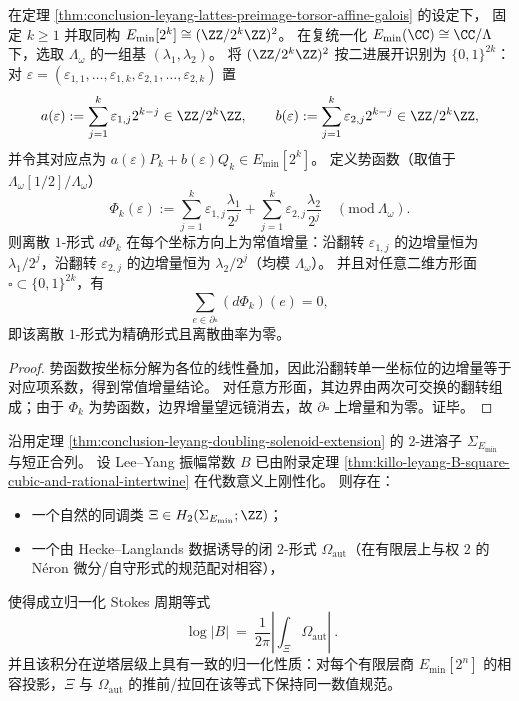 \begin{proposition}\label{prop:conclusion-leyang-lattes-hypercube-exact-form-zero-curvature}
在定理 \ref{thm:conclusion-leyang-lattes-preimage-torsor-affine-galois} 的设定下，
固定 \(k\ge 1\) 并取同构 \(E_{\min}[2^k]\cong (\ZZ/2^k\ZZ)^2\)。
在复统一化 \(E_{\min}(\CC)\cong \CC/\Lambda\) 下，选取 \(\Lambda_\omega\) 的一组基 \((\lambda_1,\lambda_2)\)。
将 \((\ZZ/2^k\ZZ)^2\) 按二进展开识别为 \(\{0,1\}^{2k}\)：
对 \(\varepsilon=(\varepsilon_{1,1},\dots,\varepsilon_{1,k},\varepsilon_{2,1},\dots,\varepsilon_{2,k})\) 置
\[
a(\varepsilon):=\sum_{j=1}^k \varepsilon_{1,j}2^{k-j}\in\ZZ/2^k\ZZ,\qquad
b(\varepsilon):=\sum_{j=1}^k \varepsilon_{2,j}2^{k-j}\in\ZZ/2^k\ZZ,
\]
并令其对应点为 \(a(\varepsilon)P_k+b(\varepsilon)Q_k\in E_{\min}[2^k]\)。
定义势函数（取值于 \(\Lambda_\omega[1/2]/\Lambda_\omega\)）
\[
\Phi_k(\varepsilon)
:=\sum_{j=1}^k \varepsilon_{1,j}\frac{\lambda_1}{2^j}+\sum_{j=1}^k \varepsilon_{2,j}\frac{\lambda_2}{2^j}\quad(\mathrm{mod}\ \Lambda_\omega).
\]
则离散 \(1\)-形式 \(d\Phi_k\) 在每个坐标方向上为常值增量：沿翻转 \(\varepsilon_{1,j}\) 的边增量恒为 \(\lambda_1/2^j\)，沿翻转 \(\varepsilon_{2,j}\) 的边增量恒为 \(\lambda_2/2^j\)（均模 \(\Lambda_\omega\)）。
并且对任意二维方形面 \(\square\subset \{0,1\}^{2k}\)，有
\[
\sum_{e\in \partial\square}(d\Phi_k)(e)=0,
\]
即该离散 \(1\)-形式为精确形式且离散曲率为零。
\end{proposition}
\begin{proof}
势函数按坐标分解为各位的线性叠加，因此沿翻转单一坐标位的边增量等于对应项系数，得到常值增量结论。
对任意方形面，其边界由两次可交换的翻转组成；由于 \(\Phi_k\) 为势函数，边界增量望远镜消去，故 \(\partial\square\) 上增量和为零。证毕。
\end{proof}

\begin{conjecture}\label{conj:conclusion-leyang-solenoid-stokes-regulator}
沿用定理 \ref{thm:conclusion-leyang-doubling-solenoid-extension} 的 \(2\)-进溶子 \(\Sigma_{E_{\min}}\) 与短正合列。
设 Lee--Yang 振幅常数 \(B\) 已由附录定理 \ref{thm:killo-leyang-B-square-cubic-and-rational-intertwine} 在代数意义上刚性化。
则存在：
\begin{itemize}
  \item 一个自然的同调类 \(\Xi\in H_2(\Sigma_{E_{\min}};\ZZ)\)；
  \item 一个由 Hecke--Langlands 数据诱导的闭 \(2\)-形式 \(\Omega_{\mathrm{aut}}\)（在有限层上与权 \(2\) 的 N\'eron 微分/自守形式的规范配对相容），
\end{itemize}
使得成立归一化 Stokes 周期等式
\[
\boxed{\ \log|B|\ =\ \frac{1}{2\pi}\left|\int_{\Xi}\Omega_{\mathrm{aut}}\right|\ }.
\]
并且该积分在逆塔层级上具有一致的归一化性质：对每个有限层商 \(E_{\min}[2^n]\) 的相容投影，\(\Xi\) 与 \(\Omega_{\mathrm{aut}}\) 的推前/拉回在该等式下保持同一数值规范。
\end{conjecture}

